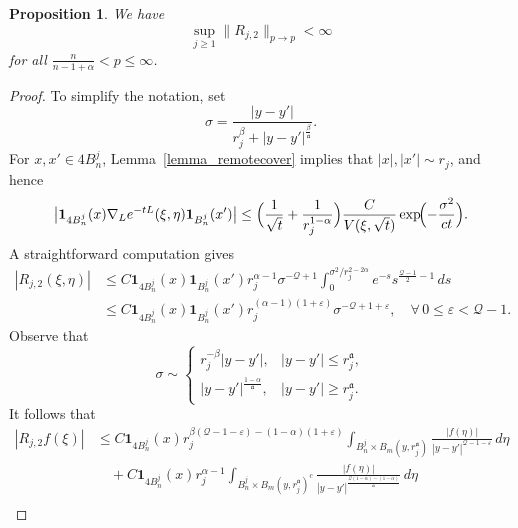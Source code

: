 \documentclass[12pt]{amsart}
\newtheorem{proposition}[theorem]{Proposition}
\begin{document}
\begin{proposition}\label{Rj,2}
We have
    \begin{equation*}
        \sup_{j\ge 1} \|R_{j,2}\|_{p\to p} <\infty
    \end{equation*}
    for all $\frac{n}{n-1+\alpha}<p\le \infty$.
\end{proposition}

\begin{proof}
To simplify the notation, set
\begin{equation}\label{sigma}
    \sigma = \frac{|y-y'|}{r_j^\beta + |y-y'|^{\frac{\beta}{\mathfrak a}}}.
\end{equation}
For $x,x'\in 4 B_n^j$, Lemma~\ref{lemma_remotecover} implies that $|x|,|x'|\sim r_j$, and hence
\begin{equation*}
    \bigl|\mathbf{1}_{4B_n^j}(x) \nabla_L e^{-tL}(\xi,\eta) \mathbf{1}_{B_n^j}(x')\bigr|\le \Bigl( \frac{1}{\sqrt{t}} + \frac{1}{r_j^{1-\alpha}} \Bigr) \frac{C}{V(\xi,\sqrt{t})} \exp\!\Bigl( - \frac{\sigma^2}{c t} \Bigr).
\end{equation*}
A straightforward computation gives
\begin{align*}
    |R_{j,2}(\xi,\eta)|
    &\le C \mathbf{1}_{4B_n^j}(x) \mathbf{1}_{B_n^j}(x') r_j^{\alpha-1} \sigma^{-\mathcal{Q}+1} \int_0^{\sigma^2/r_j^{2-2\alpha}} e^{-s} s^{\frac{\mathcal{Q}-1}{2}-1} \, ds\\
    &\le C \mathbf{1}_{4B_n^j}(x) \mathbf{1}_{B_n^j}(x') r_j^{(\alpha-1)(1+\varepsilon)} \sigma^{-\mathcal{Q}+1+\varepsilon},\quad \forall\, 0\le \varepsilon < \mathcal{Q}-1.
\end{align*}
Observe that
\begin{equation*}
    \sigma \sim \begin{cases}
        r_j^{-\beta} |y-y'|, & |y-y'|\le r_j^{\mathfrak a},\\[4pt]
        |y-y'|^{\frac{1-\alpha}{\mathfrak a}}, & |y-y'|\ge r_j^{\mathfrak a}.
    \end{cases}
\end{equation*}
It follows that
\begin{align*}
    |R_{j,2}f(\xi)|
    &\le C \mathbf{1}_{4B_n^j}(x) r_j^{\beta(\mathcal{Q}-1-\varepsilon) - (1-\alpha)(1+\varepsilon)} \int_{B_n^j \times B_m( y, r_j^{\mathfrak a} )} \frac{|f(\eta)|}{|y-y'|^{\mathcal{Q}-1-\varepsilon}} \, d\eta\\
    &\quad + C \mathbf{1}_{4B_n^j}(x) r_j^{\alpha-1} \int_{B_n^j \times B_m( y, r_j^{\mathfrak a} )^c} \frac{|f(\eta)|}{|y-y'|^{\frac{\mathcal{Q}(1-\alpha)-(1-\alpha)}{\mathfrak a}}} \, d\eta\\

\end{align*}
\end{proof}
\end{document}
